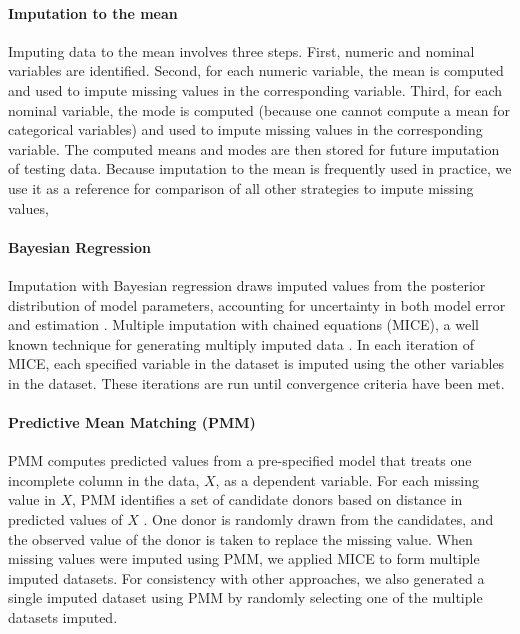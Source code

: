 \documentclass{article}
\begin{document}
\paragraph{Imputation to the mean}

Imputing data to the mean involves three steps. First, numeric and
nominal variables are identified. Second, for each numeric variable, the
mean is computed and used to impute missing values in the corresponding
variable. Third, for each nominal variable, the mode is computed
(because one cannot compute a mean for categorical variables) and used
to impute missing values in the corresponding variable. The computed
means and modes are then stored for future imputation of testing data.
Because imputation to the mean is frequently used in practice, we use it
as a reference for comparison of all other strategies to impute missing
values,

\paragraph{Bayesian Regression}

Imputation with Bayesian regression draws imputed values from the
posterior distribution of model parameters, accounting for uncertainty
in both model error and estimation \cite{rubin2004multiple}. Multiple
imputation with chained equations (MICE), a well known technique for
generating multiply imputed data
\cite{azur2011multiple, van2018flexible, van2006fully}. In each
iteration of MICE, each specified variable in the dataset is imputed
using the other variables in the dataset. These iterations are run until
convergence criteria have been met.

\paragraph{Predictive Mean Matching (PMM)}

PMM computes predicted values from a pre-specified model that treats one
incomplete column in the data, \(X\), as a dependent variable. For each
missing value in \(X\), PMM identifies a set of candidate donors based
on distance in predicted values of \(X\) \cite{landerman1997empirical}.
One donor is randomly drawn from the candidates, and the observed value
of the donor is taken to replace the missing value. When missing values
were imputed using PMM, we applied MICE to form multiple imputed
datasets. For consistency with other approaches, we also generated a
single imputed dataset using PMM by randomly selecting one of the
multiple datasets imputed.
\end{document}
